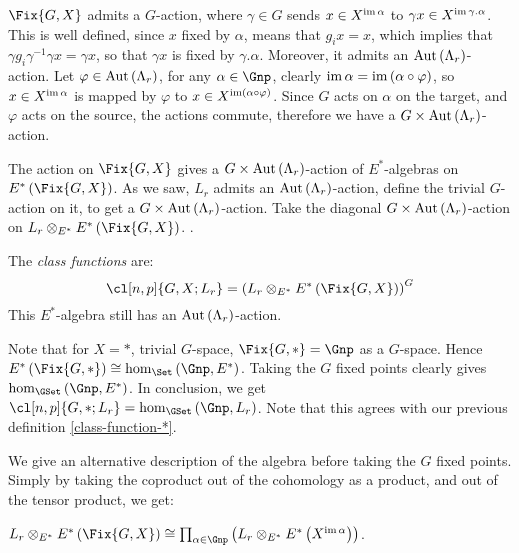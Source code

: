 $\Fix{G,X}$ admits a $G$-action, where $\gamma \in G$ sends $x \in X^{\operatorname{im} \alpha}$ to $\gamma x \in X^{\operatorname{im} \gamma.\alpha}$.
This is well defined, since $x$ fixed by $\alpha$, means that $g_i x = x$, which implies that $\gamma g_i \gamma^{-1} \gamma x = \gamma x$, so that $\gamma x$ is fixed by $\gamma. \alpha$.
Moreover, it admits an $\operatorname{Aut}\left(\Lambda_r\right)$-action.
Let $\varphi \in \operatorname{Aut}\left(\Lambda_r\right)$, for any $\alpha \in \Gnp$, clearly $\operatorname{im} \alpha = \operatorname{im} \left(\alpha\circ\varphi\right)$, so $x \in X^{\operatorname{im} \alpha}$ is mapped by $\varphi$ to $x \in X^{\operatorname{im} \left(\alpha\circ\varphi\right)}$.
Since $G$ acts on $\alpha$ on the target, and $\varphi$ acts on the source, the actions commute, therefore we have a $G \times \operatorname{Aut} \left(\Lambda_r\right)$-action.

The action on $\Fix{G,X}$ gives a $G \times \operatorname{Aut} \left(\Lambda_r\right)$-action of $E^*$-algebras on $E^*\left(\Fix{G,X}\right)$.
As we saw, $L_r$ admits an $\operatorname{Aut} \left(\Lambda_r\right)$-action, define the trivial $G$-action on it, to get a $G \times \operatorname{Aut} \left(\Lambda_r\right)$-action.
Take the diagonal $G \times \operatorname{Aut} \left(\Lambda_r\right)$-action on $L_r \otimes_{E^*} E^*\left(\Fix{G,X}\right)$.
.

\begin{definition}
	The \emph{class functions} are:
	$$
	\cl[n,p]{G,X; L_r}
	= \left(L_r \otimes_{E^*} E^*\left(\Fix{G,X}\right)\right)^G
	$$
	This $E^*$-algebra still has an $\operatorname{Aut} \left(\Lambda_r\right)$-action.
\end{definition}

Note that for $X = *$, trivial $G$-space, $\Fix{G,*} = \Gnp$ as a $G$-space.
Hence $E^*\left(\Fix{G,*}\right) \cong \hom_{\Set}\left(\Gnp, E^*\right)$.
Taking the $G$ fixed points clearly gives $\hom_{\GSet}\left(\Gnp, E^*\right)$.
In conclusion, we get $\cl[n,p]{G,*; L_r} =  \hom_{\GSet}\left(\Gnp, L_r\right)$.
Note that this agrees with our previous definition \ref{class-function-*}.

We give an alternative description of the algebra before taking the $G$ fixed points.
Simply by taking the coproduct out of the cohomology as a product, and out of the tensor product, we get:

\begin{proposition}\label{Lr-Fix}
	$
	L_r \otimes_{E^*} E^*\left(\Fix{G,X}\right)
	\cong \prod_{\alpha \in \Gnp} \left(L_r \otimes_{E^*} E^*\left(X^{\im \alpha}\right)\right)
	$.
\end{proposition}

